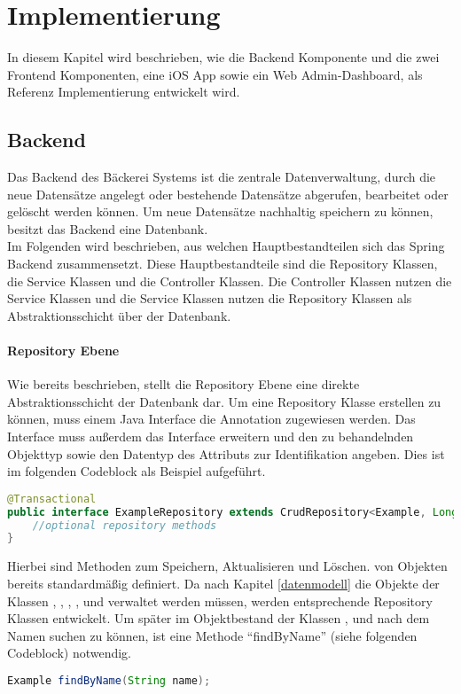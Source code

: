 \chapter{Implementierung}
In diesem Kapitel wird beschrieben, wie die Backend Komponente und die zwei Frontend Komponenten, eine iOS App sowie ein Web Admin-Dashboard, als Referenz Implementierung entwickelt wird. 

\section{Backend}
Das Backend des Bäckerei Systems ist die zentrale Datenverwaltung, durch die neue Datensätze angelegt oder bestehende Datensätze abgerufen, bearbeitet oder gelöscht werden können. Um neue Datensätze nachhaltig speichern zu können, besitzt das Backend eine Datenbank.
\\
Im Folgenden wird beschrieben, aus welchen Hauptbestandteilen sich das Spring Backend zusammensetzt.
Diese Hauptbestandteile sind die Repository Klassen, die Service Klassen und die Controller Klassen.
Die Controller Klassen nutzen die Service Klassen und die Service Klassen nutzen die Repository Klassen als Abstraktionsschicht über der Datenbank.

\clearpage

\subsubsection{Repository Ebene}
Wie bereits beschrieben, stellt die Repository Ebene eine direkte Abstraktionsschicht der Datenbank dar.
Um eine Repository Klasse erstellen zu können, muss einem Java Interface die Annotation  zugewiesen werden. Das Interface muss außerdem das Interface  erweitern und den zu behandelnden Objekttyp sowie den Datentyp des Attributs zur Identifikation angeben. Dies ist im folgenden Codeblock als Beispiel aufgeführt.
\begin{lstlisting}[language=Java]
@Transactional
public interface ExampleRepository extends CrudRepository<Example, Long> {
	//optional repository methods
}
\end{lstlisting}

Hierbei sind Methoden zum Speichern, Aktualisieren und Löschen. von Objekten bereits standardmäßig definiert.
Da nach Kapitel \ref{datenmodell} die Objekte der Klassen , , , ,  und  verwaltet werden müssen, werden entsprechende Repository Klassen entwickelt.
Um später im Objektbestand der Klassen ,  und  nach dem Namen suchen zu können, ist eine Methode \enquote{findByName} (siehe folgenden Codeblock) notwendig.
\begin{lstlisting}[language=Java]
Example findByName(String name);
\end{lstlisting}

